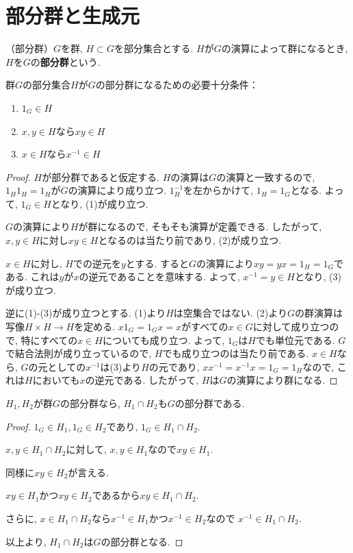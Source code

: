 \section*{部分群と生成元}
\begin{dfn*}
（部分群）$G$を群, $H\subset G$を部分集合とする. 
$H$が$G$の演算によって群になるとき, $H$を$G$の\textbf{部分群}という.
\end{dfn*}
\begin{tcolorbox}
	\begin{prp*}
		群$G$の部分集合$H$が$G$の部分群になるための必要十分条件：
		\begin{enumerate}[label=(\arabic*)\,]
			\item $1_G \in H $
			\item $x,y \in H$なら$xy \in H$
			\item $x\in H$なら$x^{-1}\in H$ 
		\end{enumerate}
	\end{prp*}
\end{tcolorbox}
\begin{proof}
	$H$が部分群であると仮定する. $H$の演算は$G$の演算と一致するので,
	$1_H1_H=1_H$が$G$の演算により成り立つ. $1_H^{-1}$を左からかけて,
	$1_H=1_G$となる. よって, $1_G \in H$となり, (1)が成り立つ.

	$G$の演算により$H$が群になるので, そもそも演算が定義できる.
	したがって, $x,y \in H$に対し$xy\in H$となるのは当たり前であり,
	(2)が成り立つ.

	$x \in H$に対し, $H$での逆元を$y$とする. 
	すると$G$の演算により$xy=yx=1_H=1_G$である.
	これは$y$が$x$の逆元であることを意味する.
	よって, $x^{-1}=y \in H$となり, (3)が成り立つ.

	逆に(1)-(3)が成り立つとする. (1)より$H$は空集合ではない.
	(2)より$G$の群演算は写像$H\times H\to H$を定める.
	$x1_G=1_Gx=x$がすべての$x\in G$に対して成り立つので,
	特にすべての$x \in H$についても成り立つ.
	よって, $1_G$は$H$でも単位元である.
	$G$で結合法則が成り立っているので, $H$でも成り立つのは当たり前である.
	$x \in H$なら, $G$の元としての$x^{-1}$は(3)より$H$の元であり,
	$xx^{-1}=x^{-1}x=1_G=1_H$なので, これは$H$においても$x$の逆元である.
	したがって, $H$は$G$の演算により群になる.
\end{proof}

\begin{tcolorbox}
\begin{prp*}
  $H_1,H_2$が群$G$の部分群なら, $H_1 \cap H_2$も$G$の部分群である.
\end{prp*}
\end{tcolorbox}
\begin{proof}
  $1_G \in H_1, 1_G \in H_2$であり, $1_G \in H_1 \cap H_2 $.
  
  $ x,y \in H_1 \cap H_2 $に対して,
  $ x,y \in H_1 $なので$ xy \in H_1 $.

  同様に$xy \in H_2 $が言える.

  $ xy \in H_1 $かつ$xy \in H_2 $であるから$xy \in H_1 \cap H_2 $.

  さらに, $x \in H_1 \cap H_2$なら$x^{-1}\in H_1$かつ$x^{-1} \in H_2$なので
  $x^{-1} \in H_1 \cap H_2$.

  以上より, $H_1 \cap H_2$は$G$の部分群となる.
\end{proof}

